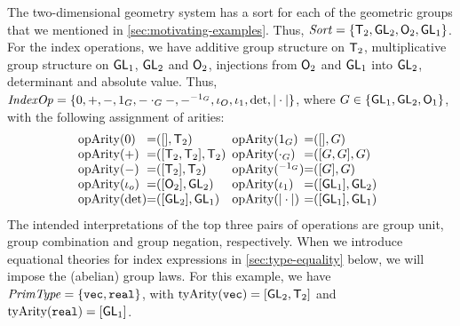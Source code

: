 \begin{example}
  The two-dimensional geometry system has a sort for each of the
  geometric groups that we mentioned in
  \autoref{sec:motivating-examples}. Thus, $\mathit{Sort} = \{\mathsf{T}_2,
  \mathsf{GL}_2, \mathsf{O}_2, \mathsf{GL}_1 \}$. For the index operations, we
  have additive group structure on $\mathsf{T}_2$, multiplicative
  group structure on $\mathsf{GL}_1$, $\mathsf{GL}_2$ and $\mathsf{O}_2$,
  injections from $\mathsf{O}_2$ and $\mathsf{GL}_1$ into $\mathsf{GL}_2$,
  determinant and absolute value. Thus, $\mathit{IndexOp} = \{ 0, +, -,
  1_G, -\cdot_G-, -^{-1_G}, \iota_O, \iota_1, \det, |\cdot| \}$, where
  $G \in \{\mathsf{GL}_1, \mathsf{GL}_2, \mathsf{O}_1\}$, with the following
  assignment of arities:
  \begin{displaymath}
    \begin{array}{@{}l@{\hspace{0em}=\hspace{0em}}l@{\hspace{0.5em}}l@{\hspace{0em}=\hspace{0em}}l}
      \indexOpArity(0) & ([], \SynTransl_2) &
      \indexOpArity(1_G) & ([], G) \\
      \indexOpArity(+) & ([\SynTransl_2, \SynTransl_2], \SynTransl_2) &
      \indexOpArity(\cdot_G) & ([G,G],G) \\
      \indexOpArity(-) & ([\SynTransl_2], \SynTransl_2) &
      \indexOpArity(^{-1_G}) & ([G], G) \\
      \indexOpArity(\iota_o) & ([\SynOrth_2], \SynGL_2) &
      \indexOpArity(\iota_1) & ([\SynGL_1], \SynGL_2) \\
      \indexOpArity(\det) & ([\SynGL_2], \SynGL_1) &
      \indexOpArity(|\cdot|) & ([\SynGL_1], \SynGL_1)
    \end{array}
  \end{displaymath}
  The intended interpretations of the top three pairs of operations
  are group unit, group combination and group negation,
  respectively. When we introduce equational theories for index
  expressions in \autoref{sec:type-equality} below, we will impose the
  (abelian) group laws. For this example, we have $\mathit{PrimType} = \{
  \texttt{vec}, \texttt{real} \}$, with
  $\mathrm{tyArity}(\texttt{vec}) = [\mathsf{GL}_2, \mathsf{T}_2]$ and
  $\mathrm{tyArity}(\texttt{real}) = [\mathsf{GL}_1]$.
\end{example}


